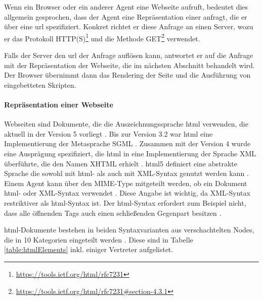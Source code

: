         Wenn ein Browser oder ein anderer Agent eine Webseite aufruft,
        bedeutet dies allgemein gesprochen, dass der Agent eine Repräsentation
        einer {\resource} anfragt, die er über eine \gls{url} spezifiziert.
        Konkret richtet er diese Anfrage an einen Server,
        wozu er das Protokoll HTTP(S)\footnote{\url{https://tools.ietf.org/html/rfc7231}} und die Methode
        GET\footnote{\url{https://tools.ietf.org/html/rfc7231\#section-4.3.1}} verwendet.

        Falls der Server den \gls{url} der Anfrage auflösen kann,
        antwortet er auf die Anfrage mit der Repräsentation der Webseite,
        die im nächsten Abschnitt behandelt wird.
        Der Browser übernimmt dann das Rendering der Seite und die Ausführung
        von eingebetteten Skripten.

        \paragraph*{Repräsentation einer Webseite}
        Webseiten sind Dokumente, die die Auszeichnungssprache \gls{html} verwenden,
        die aktuell in der Version 5 vorliegt \cite{w3c:html5}.
        Bis zur Version 3.2 war \gls{html} eine Implementierung der Metasprache SGML \cite[Kapitel 3]{w3c:html401}.
        Zusammen mit der Version 4 wurde eine Ausprägung spezifiziert,
        die \gls{html} in eine Implementierung der Sprache XML überführte,
        die den Namen XHTML erhielt \cite{w3c:xhtml}.
        \gls{html}5 definiert eine abstrakte Sprache
        die sowohl mit \gls{html}- als auch mit XML-Syntax genutzt werden kann
        \cite[Kapitel 1.6]{w3c:html5}.
        Einem Agent kann über den MIME-Type mitgeteilt werden,
        ob ein Dokument \gls{html}- oder XML-Syntax verwendet \cite[Kapitel 1.6]{w3c:html5}.
        Diese Angabe ist wichtig, da XML-Syntax restriktiver als \gls{html}-Syntax ist.
        Der \gls{html}-Syntax erfordert zum Beispiel nicht,
        dass alle öffnenden Tags auch einen schließenden Gegenpart besitzen
        \cite[Kapitel 3.2.3]{w3c:html5}.
        
        \gls{html}-Dokumente bestehen in beiden Syntaxvarianten aus verschachtelten
        Nodes, die in 10 Kategorien eingeteilt werden \cite[Kapitel 4]{w3c:html5}.
        Diese sind in Tabelle \ref{table:htmlElements} inkl. einiger Vertreter aufgelistet.


